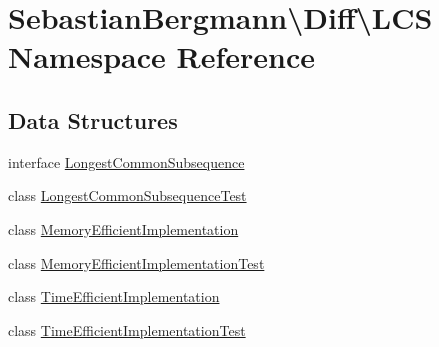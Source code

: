 \hypertarget{namespace_sebastian_bergmann_1_1_diff_1_1_l_c_s}{}\section{Sebastian\+Bergmann\textbackslash{}Diff\textbackslash{}L\+CS Namespace Reference}
\label{namespace_sebastian_bergmann_1_1_diff_1_1_l_c_s}
\subsection*{Data Structures}
\begin{DoxyCompactItemize}
\item 
interface \mbox{\hyperlink{interface_sebastian_bergmann_1_1_diff_1_1_l_c_s_1_1_longest_common_subsequence}{Longest\+Common\+Subsequence}}
\item 
class \mbox{\hyperlink{class_sebastian_bergmann_1_1_diff_1_1_l_c_s_1_1_longest_common_subsequence_test}{Longest\+Common\+Subsequence\+Test}}
\item 
class \mbox{\hyperlink{class_sebastian_bergmann_1_1_diff_1_1_l_c_s_1_1_memory_efficient_implementation}{Memory\+Efficient\+Implementation}}
\item 
class \mbox{\hyperlink{class_sebastian_bergmann_1_1_diff_1_1_l_c_s_1_1_memory_efficient_implementation_test}{Memory\+Efficient\+Implementation\+Test}}
\item 
class \mbox{\hyperlink{class_sebastian_bergmann_1_1_diff_1_1_l_c_s_1_1_time_efficient_implementation}{Time\+Efficient\+Implementation}}
\item 
class \mbox{\hyperlink{class_sebastian_bergmann_1_1_diff_1_1_l_c_s_1_1_time_efficient_implementation_test}{Time\+Efficient\+Implementation\+Test}}
\end{DoxyCompactItemize}
